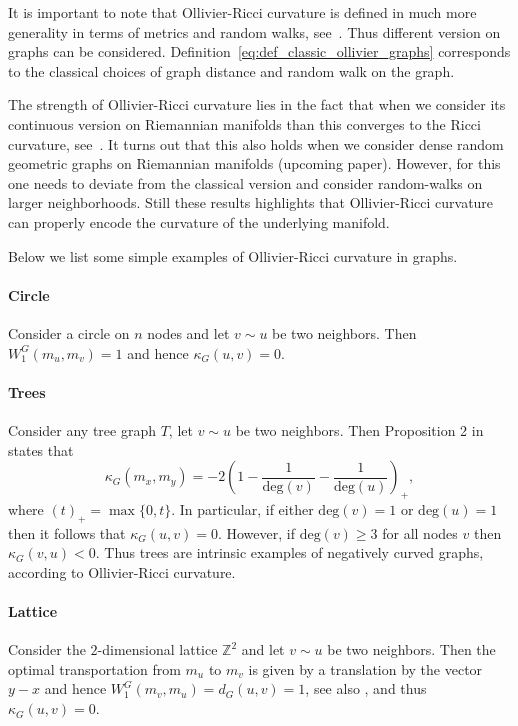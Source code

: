 \documentclass{article}
\begin{document}
It is important to note that Ollivier-Ricci curvature is defined in much more generality in terms of metrics and random walks, see~\cite{ollivier2009ricci}. Thus different version on graphs can be considered. Definition~\eqref{eq:def_classic_ollivier_graphs} corresponds to the classical choices of graph distance and random walk on the graph.

The strength of Ollivier-Ricci curvature lies in the fact that when we consider its continuous version on Riemannian manifolds than this converges to the Ricci curvature, see~\cite[Example 7]{ollivier2009ricci}. It turns out that this also holds when we consider dense random geometric graphs on Riemannian manifolds (upcoming paper). However, for this one needs to deviate from the classical version and consider random-walks on larger neighborhoods. Still these results highlights that Ollivier-Ricci curvature can properly encode the curvature of the underlying manifold. 


Below we list some simple examples of Ollivier-Ricci curvature in graphs.

\paragraph{Circle}

Consider a circle on $n$ nodes and let $v \sim u$ be two neighbors. Then $W_1^G(m_u,m_v) = 1$ and hence $\kappa_G(u,v) = 0$.

\paragraph{Trees}

Consider any tree graph $T$, let $v \sim u$ be two neighbors. Then Proposition 2 in \cite{jost2014ollivier} states that
\[
	\kappa_G(m_x,m_y) = -2\left(1 - \frac{1}{\mathrm{deg}(v)} - \frac{1}{\mathrm{deg}(u)}\right)_+, 
\]
where $(t)_+ = \max\{0,t\}$. In particular, if either $\mathrm{deg}(v) = 1$ or $\mathrm{deg}(u) = 1$ then it follows that $\kappa_G(u,v) = 0$. However, if $\mathrm{deg}(v) \ge 3$ for all nodes $v$ then $\kappa_G(v,u) < 0$. Thus trees are intrinsic examples of negatively curved graphs, according to Ollivier-Ricci curvature.

\paragraph{Lattice}
Consider the $2$-dimensional lattice $\mathbb{Z}^2$ and let $v \sim u$ be two neighbors. Then the optimal transportation from $m_u$ to $m_v$ is given by a translation by the vector $y - x$ and hence $W_1^G(m_v,m_u) = d_G(u,v) = 1$, see also \cite[Example 5]{ollivier2009ricci}, and thus $\kappa_G(u,v) = 0$.
\end{document}

